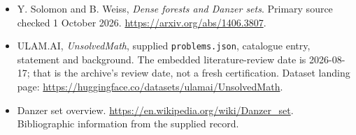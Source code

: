 \documentclass[11pt,a4paper]{article}
\begin{document}
{\small

\begin{itemize}
\item[E1] Y. Solomon and B. Weiss, \emph{Dense forests and Danzer sets}. Primary source checked 1 October 2026. \url{https://arxiv.org/abs/1406.3807}.


\item[\hypertarget{source:statement:1}{S1}] ULAM.AI, \emph{UnsolvedMath}, supplied \texttt{problems.json}, catalogue entry, statement and background. The embedded literature-review date is 2026-08-17; that is the archive’s review date, not a fresh certification. Dataset landing page: \url{https://huggingface.co/datasets/ulamai/UnsolvedMath}.

\item[\hypertarget{source:statement:2}{S2}] Danzer set overview. \url{https://en.wikipedia.org/wiki/Danzer_set}. Bibliographic information from the supplied record.

\end{itemize}

}

\label{end:statement}
\end{document}
